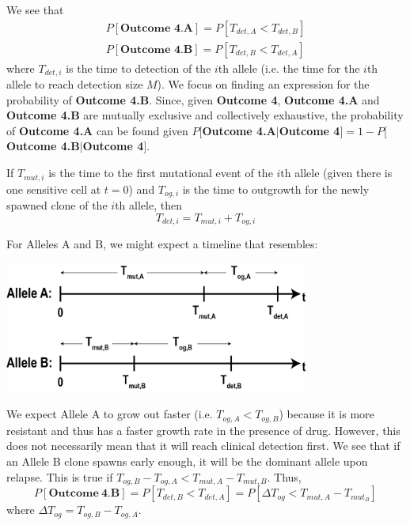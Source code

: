 \documentclass{article}
\begin{document}
We see that
\begin{equation}
\begin{split}
P[\textbf{Outcome 4.A}] = P[T_{det,A} < T_{det,B}] \\
P[\textbf{Outcome 4.B}] = P[T_{det,B} < T_{det,A}]
\end{split}
\end{equation}
where $T_{det,i}$ is the time to detection of the $i$th allele (i.e. the time for the $i$th allele to reach detection size $M$).  We focus on finding an expression for the probability of \textbf{Outcome 4.B}.  Since, given \textbf{Outcome 4}, \textbf{Outcome 4.A} and \textbf{Outcome 4.B} are mutually exclusive and collectively exhaustive, the probability of \textbf{Outcome 4.A} can be found given $P[$\textbf{Outcome 4.A}$|$\textbf{Outcome 4}$] = 1 - P[$\textbf{Outcome 4.B}$|$\textbf{Outcome 4}$]$.

If $T_{mut,i}$ is the time to the first mutational event of the $i$th allele (given there is one sensitive cell at $t=0$) and $T_{og,i}$ is the time to outgrowth for the newly spawned clone of the $i$th allele, then
\begin{equation}
T_{det,i} = T_{mut,i} + T_{og,i}
\end{equation}

For Alleles A and B, we might expect a timeline that resembles:
\begin{center}
\includegraphics[width=0.75\textwidth]{TwoAlleleTimeline}
\end{center}

We expect Allele A to grow out faster (i.e. $T_{og,A} < T_{og,B}$) because it is more resistant and thus has a faster growth rate in the presence of drug.  However, this does not necessarily mean that it will reach clinical detection first.  We see that if an Allele B clone spawns early enough, it will be the dominant allele upon relapse.  This is true if $T_{og,B}-T_{og,A} < T_{mut,A}-T_{mut,B}$.  Thus,
\begin{equation}
P[\mathbf{Outcome\:4.B}] = P[T_{det,B} < T_{det,A}] = P[\Delta T_{og} < T_{mut,A} - T_{mut_B}]
\end{equation}
where $\Delta T_{og} = T_{og,B}-T_{og,A}$.
\end{document}
